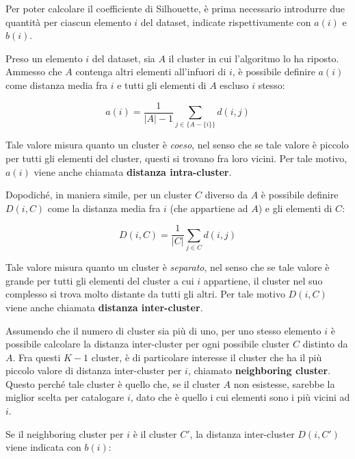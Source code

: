\documentclass[a4paper, 12pt]{report}
\begin{document}
			Per poter calcolare il coefficiente di Silhouette, è prima necessario
			introdurre due quantità per ciascun elemento $i$ del dataset, indicate
			rispettivamente con $a(i)$ e $b(i)$.

			Preso un elemento $i$ del dataset, sia $A$ il cluster in cui l'algoritmo
			lo ha riposto. Ammesso che $A$ contenga altri elementi all'infuori di $i$,
			è possibile definire $a(i)$ come distanza media fra $i$ e tutti gli elementi
			di $A$ escluso $i$ stesso:

			\begin{equation}
				a(i) = \frac{1}{|A| - 1} \sum_{j \in \{A - \{i\}\}} d(i, j)
			\end{equation}

			Tale valore misura quanto un cluster è \textit{coeso}, nel senso
			che se tale valore è piccolo per tutti gli elementi del cluster,
			questi si trovano fra loro vicini. Per tale motivo, $a(i)$ viene
			anche chiamata \textbf{distanza intra-cluster}.

			Dopodiché, in maniera simile, per un cluster $C$ diverso da $A$
			è possibile definire $D(i, C)$ come la distanza media fra $i$
			(che appartiene ad $A$) e gli elementi di $C$:

			\begin{equation*}
				D(i, C) = \frac{1}{|C|} \sum_{j \in C} d(i, j)
			\end{equation*}

			Tale valore misura quanto un cluster è \textit{separato}, nel senso
			che se tale valore è grande per tutti gli elementi del cluster a cui
			$i$ appartiene, il cluster nel suo complesso si trova molto distante
			da tutti gli altri. Per tale motivo $D(i, C)$ viene anche chiamata
			\textbf{distanza inter-cluster}.

			Assumendo che il numero di cluster sia più di uno, per uno stesso elemento
			$i$ è possibile calcolare la distanza inter-cluster per ogni possibile
			cluster $C$ distinto da $A$. Fra questi $K - 1$ cluster, è di particolare
			interesse il cluster che ha il più piccolo valore di distanza inter-cluster
			per $i$, chiamato \textbf{neighboring cluster}. Questo perché tale cluster
			è quello che, se il cluster $A$ non esistesse, sarebbe la miglior scelta
			per catalogare $i$, dato che è quello i cui elementi sono i più vicini ad
			$i$.

			Se il neighboring cluster per $i$ è il cluster $C'$, la distanza
			inter-cluster $D(i, C')$ viene indicata con $b(i)$:
\end{document}
